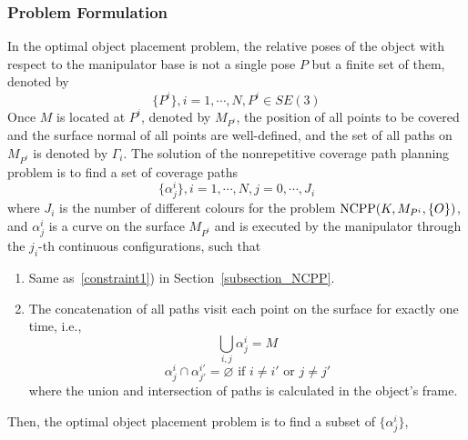 \documentclass[letterpaper, 10pt, conference]{ieeeconf}
\begin{document}
\subsubsection{Problem Formulation}
In the optimal object placement problem, the relative poses of the object with respect to the manipulator base is not a single pose $P$ but a finite set of them, denoted by 
\begin{equation}
\{P^i\}, i = 1, \cdots, N, P^i\in SE(3)
\end{equation}
Once $M$ is located at $P^i$, denoted by $M_{P^i}$, the position of all points to be covered and the surface normal of all points are well-defined, and the set of all paths on $M_{P^i}$ is denoted by $\Gamma_i$. 
The solution of the nonrepetitive coverage path planning problem is to find a set of coverage paths
\begin{equation}
\{\alpha_j^i\}, i = 1, \cdots, N, j = 0, \cdots, J_i 
\end{equation}
where $J_i$ is the number of different colours for the problem ${\rm NCPP}(K, M_{P^i}, \{O\})$, and $\alpha_j^i$ is a curve on the surface $M_{P^i}$ and is executed by the manipulator through the $j_i$-th continuous configurations, such that
\begin{enumerate}
\item Same as~\ref{constraint1}) in Section~\ref{subsection_NCPP}.
\item The concatenation of all paths visit each point on the surface for exactly one time, i.e., \label{constraint2}
\begin{equation}
\bigcup\limits_{i, j} \alpha_j^i = M
\end{equation}
\begin{equation}
\alpha_j^i\cap \alpha_{j'}^{i'} = \varnothing\mbox{ if }i \neq i'\mbox{ or }j \neq j'
\end{equation}
where the union and intersection of paths is calculated in the object's frame. 
\end{enumerate} 
Then, the optimal object placement problem is to find a subset of $\{\alpha^i_j\}$, 
\end{document}
